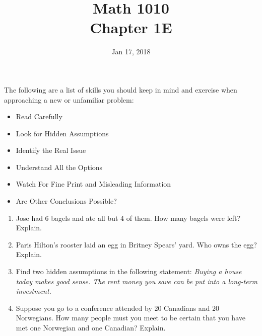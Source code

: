 \documentclass[12pt]{article}
\begin{document}
\title{\bf Math 1010 \\ Chapter 1E}
\date{Jan 17, 2018}
\maketitle





\renewcommand{\theenumi}{\alph{enumi}}
\renewcommand{\labelenumi}{(\theenumi)}

The following are a list of skills you should keep in mind and exercise when approaching a new or unfamiliar problem:
\begin{itemize}
	\item Read Carefully
	\item Look for Hidden Assumptions
	\item Identify the Real Issue
	\item Understand All the Options
	\item Watch For Fine Print and Misleading Information
	\item Are Other Conclusions Possible?
\end{itemize}

\pagebreak



\begin{enumerate}
	\item Jose had 6 bagels and ate all but 4 of them. How many bagels were left? Explain.
	\vspace{1in}
	\item 	Paris Hilton’s rooster laid an egg in Britney Spears’ yard. Who owns the egg? Explain.
	\vspace{1in}
	\item Find two hidden assumptions in the following statement: \emph{Buying a house today makes good sense. The rent money you save can be put into a long-term investment.}
	\vspace{1in}
	\item Suppose you go to a conference attended by 20 Canadians and 20 Norwegians. How many people must you meet to be certain that you have met one Norwegian and one Canadian? Explain.
	\vspace{1in}
\end{enumerate}
\end{document}
